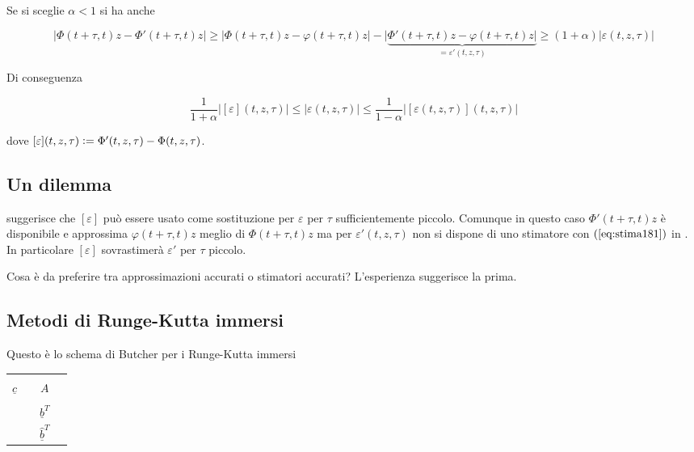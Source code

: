 \documentclass[hidelinks, 10pt]{report}
\begin{document}
Se si sceglie $ \alpha < 1 $ si ha anche 

\begin{dmath*}
{\vert \Phi(t + \tau, t)z - \Phi'(t + \tau, t)z \vert} \ge {\vert \Phi(t + \tau, t)z - \varphi(t + \tau, t)z \vert} - {\vert \underbrace{\Phi'(t + \tau, t)z - \varphi(t + \tau, t)z \vert}_{= \varepsilon'(t, z, \tau)}} \ge {(1 + \alpha) \vert \varepsilon(t, z, \tau) \vert}
\end{dmath*}

Di conseguenza

\begin{equation}	\label{eq:stima181}
\frac{1}{1 + \alpha} \vert [\varepsilon](t, z, \tau) \vert \le \vert \varepsilon(t, z, \tau) \vert \le \frac{1}{1 - \alpha} \vert [\varepsilon(t, z, \tau)](t, z, \tau) \vert
\end{equation}

dove $ [\varepsilon](t, z, \tau) \vcentcolon= \Phi'(t, z, \tau) - \Phi(t, z, \tau) $.

\subsection{Un dilemma}
 suggerisce che $ [\varepsilon] $ pu\`o essere usato come sostituzione per $ \varepsilon $ per $ \tau $ sufficientemente piccolo. %
Comunque in questo caso $ \Phi'(t + \tau, t)z $ \`e disponibile e approssima $ \varphi(t + \tau, t)z $ meglio di $ \Phi(t + \tau, t)z $ ma per $ \varepsilon'(t, z, \tau) $ non si dispone di uno stimatore con $ (\ref{eq:stima181}) $ in . In particolare $ [\varepsilon] $ sovrastimer\`a $ \varepsilon' $ per $ \tau $ piccolo.

Cosa \`e da preferire tra approssimazioni accurati o stimatori accurati? L'esperienza suggerisce la prima.

\subsection{Metodi di Runge-Kutta immersi}
Questo \`e lo schema di Butcher per  i Runge-Kutta immersi

\begin{center}
\begin{tabular}{c|ccc}
                  &   &       & \\
$ \underline{c} $ &   & $ A $ & \\
				  &   &       & \\
\hline
				  &   & $ \underline{b}^{T} $ & \\
\hline
				  &   & $ \hat{\underline{b}}^{T} $ & \\
\end{tabular}
\end{center}
\end{document}
